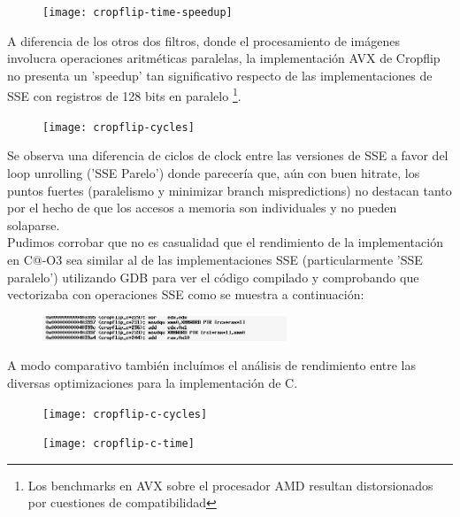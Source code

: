 \begin{figure}[h]
\centering
\texttt{[image: cropflip-time-speedup]} 
\label{fig:cropflip-time-speedup}
\end{figure}

A diferencia de los otros dos filtros, donde el procesamiento de imágenes involucra operaciones aritméticas paralelas, la implementación AVX de	 Cropflip no presenta un 'speedup' tan significativo respecto de las implementaciones de SSE con registros de 128 bits en paralelo \footnote{Los benchmarks en AVX sobre el procesador AMD resultan distorsionados por cuestiones de compatibilidad}. 

\begin{figure}[h]
\centering
\texttt{[image: cropflip-cycles]} 
\label{fig:cropflip-cycles}
\end{figure}



Se observa una diferencia de ciclos de clock entre las versiones de SSE a favor del loop unrolling ('SSE Parelo') donde parecería que, aún con buen hitrate, los puntos fuertes  (paralelismo y minimizar branch mispredictions)  no destacan tanto por el hecho de que los accesos a memoria son individuales y no pueden solaparse.
\\
Pudimos corrobar que no es casualidad que el rendimiento de la implementación en C@-O3 sea similar al de las implementaciones SSE (particularmente 'SSE paralelo') utilizando GDB para ver el código compilado y comprobando que vectorizaba con operaciones SSE como se muestra a continuación:

\begin{figure}[h]
\centering
\includegraphics[width=0.65\textwidth]{untitled}
\end{figure}

A modo comparativo también incluímos el análisis de rendimiento entre las diversas optimizaciones para la implementación de C.

\begin{figure}[h]
\centering
\texttt{[image: cropflip-c-cycles]} 
\label{fig:cropflip-c-cycles}
\end{figure}

\begin{figure}[h]
\centering
\texttt{[image: cropflip-c-time]} 
\label{fig:cropflip-c-time}
\end{figure}

